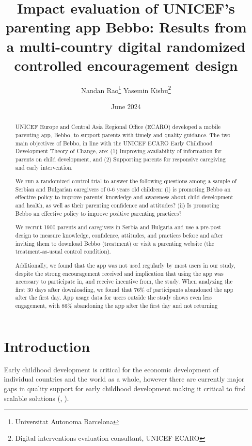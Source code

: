 \documentclass{article}
\author{{ Nandan Rao}\thanks{Universitat Autonoma Barcelona}
\hspace{85pt} {Yasemin Kisbu}\thanks{Digital interventions evaluation
consultant, UNICEF ECARO}\vspace{5pt}}
\title{Impact evaluation of UNICEF’s parenting app Bebbo: Results from a multi-country digital randomized controlled encouragement design}
\date{June 2024}
\begin{document}
\maketitle



\begin{abstract}

UNICEF Europe and Central Asia Regional Office (ECARO) developed a mobile parenting app, Bebbo, to support parents with timely and quality guidance. The two main objectives of Bebbo, in line with the UNICEF ECARO Early Childhood Development Theory of Change, are: (1) Improving availability of information for parents on child development, and (2) Supporting parents for responsive caregiving and early intervention.

We run a randomized control trial to answer the following questions among a sample of Serbian and Bulgarian caregivers of 0-6 years old children: (i) is promoting Bebbo an effective policy to improve parents’ knowledge and awareness about child development and health, as well as their parenting confidence and attitudes? (ii) Is promoting Bebbo an effective policy to  improve positive parenting practices?

We recruit 1900 parents and caregivers in Serbia and Bulgaria and use a pre-post design to measure knowledge, confidence, attitudes, and practices before and after inviting them to download Bebbo (treatment) or visit a parenting website (the treatment-as-usual control condition).

Additionally, we found that the app was not used regularly by most users in our study, despite the strong encouragement received and implication that using the app was necessary to participate in, and receive incentive from, the study. When analyzing the first 30 days after downloading, we found that 76\% of participants abandoned the app after the first day. App usage data for users outside the study shows even less engagement, with 86\% abandoning the app after the first day and not returning
\end{abstract}
\clearpage

\section{Introduction}

Early childhood development is critical for the economic development of individual countries and the world as a whole, however there are currently major gaps in quality support for early childhood development making it critical to find scalable solutions (\cite{Black2018}, \cite{Attanasio2022}).
\end{document}
